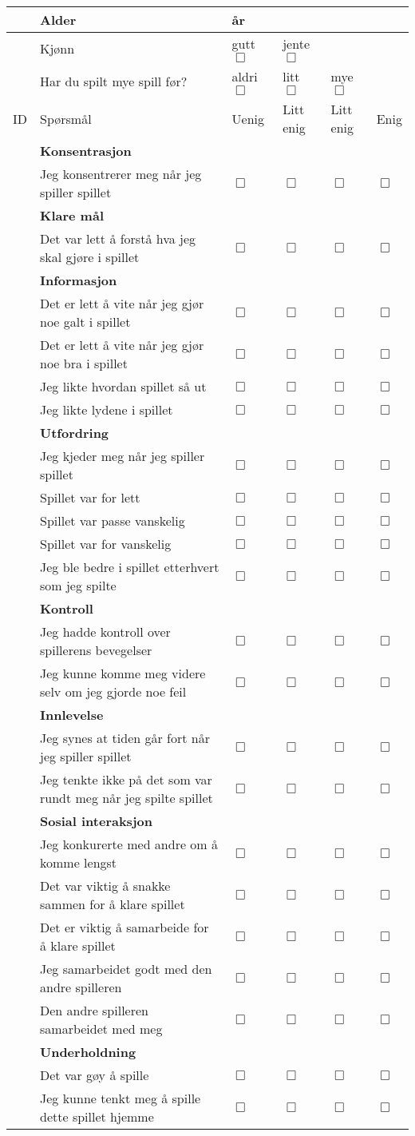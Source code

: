 \documentclass[11pt, a4paper]{report}
\begin{document}
	\setcounter{qnumber}{0}

	\newcommand{\question}[1]{
		\theqnumber &\textsf{#1} &{\Large $\Box$} & {\Large $\Box$} &{\Large $\Box$} &{\Large $\Box$}\stepcounter{qnumber}\\ \hline
	}

	\newcommand{\heading}[1]{
		&\multicolumn{4}{l}{\bf\textsf{#1} \hfill} 
		&\\ \hline %
	}
	\newcommand{\divider}{\hline}
	
	\begin{longtable}{|c| p{10cm}|p{1.7cm}|p{1.5cm}|p{1.5cm}|p{1.5cm}|}
		\divider
			& Alder & \multicolumn{4}{|l|}{\underline{\hspace{0.5cm}} år} \\
		\divider
			& Kjønn & gutt {\Large $\Box$} & jente {\Large $\Box$} & \multicolumn{2}{|l|}{} \\
		\divider
			& Har du spilt mye spill før? & aldri {\Large $\Box$} & litt {\Large $\Box$} & mye {\Large $\Box$} & \\
		\divider
			ID     & Spørsmål & Uenig & Litt enig & Litt enig & Enig\\
		\divider
		\heading{Konsentrasjon}
		\question{Jeg konsentrerer meg når jeg spiller spillet}
		\heading{Klare mål}
		\question{Det var lett å forstå hva jeg skal gjøre i spillet}
		\heading{Informasjon}
		\question{Det er lett å vite når jeg gjør noe galt i spillet}
		\question{Det er lett å vite når jeg gjør noe bra i spillet}
		\question{Jeg likte hvordan spillet så ut}
		\question{Jeg likte lydene i spillet}
		\heading{Utfordring}
		\question{Jeg kjeder meg når jeg spiller spillet}
		\question{Spillet var for lett}
		\question{Spillet var passe vanskelig}
		\question{Spillet var for vanskelig}
		\question{Jeg ble bedre i spillet etterhvert som jeg spilte}
		\heading{Kontroll}
		\question{Jeg hadde kontroll over spillerens bevegelser}
		\question{Jeg kunne komme meg videre selv om jeg gjorde noe feil}
		\heading{Innlevelse}
		\question{Jeg synes at tiden går fort når jeg spiller spillet}
		\question{Jeg tenkte ikke på det som var rundt meg når jeg spilte spillet}
		\heading{Sosial interaksjon}
		\question{Jeg konkurerte med andre om å komme lengst}
		\question{Det var viktig å snakke sammen for å klare spillet}
		\question{Det er viktig å samarbeide for å klare spillet}
		\question{Jeg samarbeidet godt med den andre spilleren}
		\question{Den andre spilleren samarbeidet med meg}
		\heading{Underholdning}
		\question{Det var gøy å spille}
		\question{Jeg kunne tenkt meg å spille dette spillet hjemme}
		
	\end{longtable}
\end{document}
